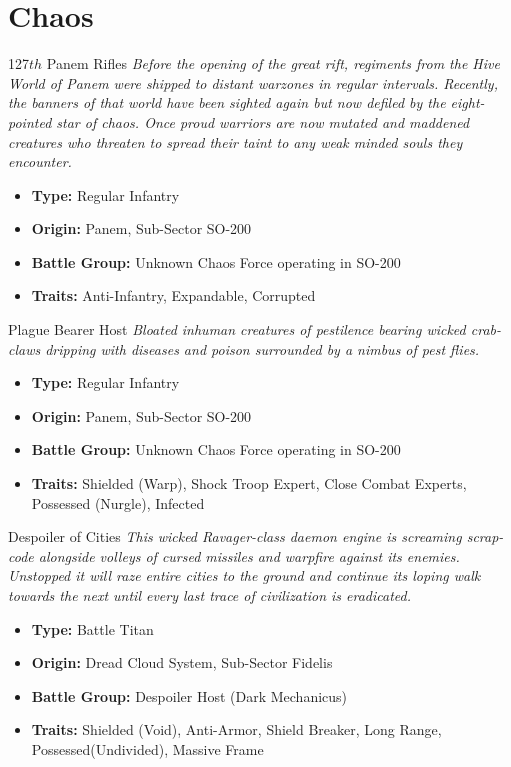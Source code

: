 \section{Chaos}
\begin{DndSidebar}{127${th}$ Panem Rifles}
\textit{Before the opening of the great rift, regiments from the Hive World of Panem were shipped to distant warzones in regular intervals. Recently, the banners of that world have been sighted again but now defiled by the eight-pointed star of chaos. Once proud warriors are now mutated and maddened creatures who threaten to spread their taint to any weak minded souls they encounter.}
\begin{itemize}
	\item \textbf{Type:} Regular Infantry
	\item \textbf{Origin:} Panem, Sub-Sector SO-200
	\item \textbf{Battle Group:} Unknown Chaos Force operating in SO-200
	\item \textbf{Traits:} Anti-Infantry, Expandable, Corrupted
\end{itemize}
\end{DndSidebar}

\begin{DndSidebar}{Plague Bearer Host}
\textit{Bloated inhuman creatures of pestilence bearing wicked crab-claws dripping with diseases and poison surrounded by a nimbus of pest flies.}
\begin{itemize}
	\item \textbf{Type:} Regular Infantry
	\item \textbf{Origin:} Panem, Sub-Sector SO-200
	\item \textbf{Battle Group:} Unknown Chaos Force operating in SO-200
	\item \textbf{Traits:} Shielded (Warp), Shock Troop Expert, Close Combat Experts, Possessed (Nurgle), Infected
\end{itemize}
\end{DndSidebar}

\begin{DndSidebar}{Despoiler of Cities}
\textit{This wicked Ravager-class daemon engine is screaming scrap-code alongside volleys of cursed missiles and warpfire against its enemies. Unstopped it will raze entire cities to the ground and continue its loping walk towards the next until every last trace of civilization is eradicated.}
\begin{itemize}
	\item \textbf{Type:} Battle Titan
	\item \textbf{Origin:} Dread Cloud System, Sub-Sector Fidelis
	\item \textbf{Battle Group:} Despoiler Host (Dark Mechanicus)
	\item \textbf{Traits:} Shielded (Void), Anti-Armor, Shield Breaker, Long Range, Possessed(Undivided), Massive Frame
\end{itemize}
\end{DndSidebar}